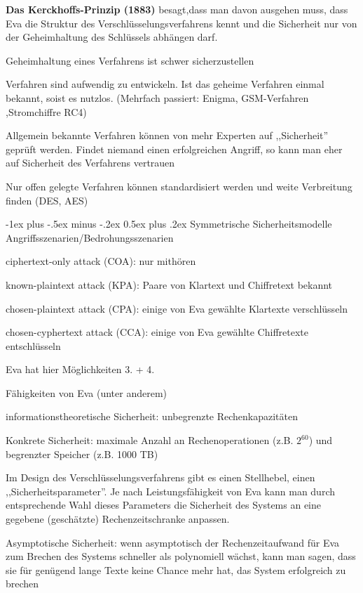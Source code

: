 \documentclass[a4paper]{article}
\makeatletter
\renewcommand{\note}[2]{\begin{noteBox} \textbf{#1} #2 \end{noteBox}}
\renewcommand{\section}{\@startsection{section}{1}{0mm}%
 {-1ex plus -.5ex minus -.2ex}%
 {0.5ex plus .2ex}%
 {\normalfont\large\bfseries}}
\makeatother
\begin{document}
\begin{multicols}{3}
    \note{Das Kerckhoffs-Prinzip (1883)}{
        besagt,dass man davon ausgehen muss, dass Eva die Struktur des Verschlüsselungsverfahrens kennt und die Sicherheit nur von der Geheimhaltung des Schlüssels abhängen darf.
        \begin{enumerate*}
            \item Geheimhaltung eines Verfahrens ist schwer sicherzustellen
            \item Verfahren sind aufwendig zu entwickeln. Ist das geheime Verfahren einmal bekannt, soist es nutzlos. (Mehrfach passiert: Enigma, GSM-Verfahren ,Stromchiffre RC4)
            \item Allgemein bekannte Verfahren können von mehr Experten auf ,,Sicherheit'' geprüft werden. Findet niemand einen erfolgreichen Angriff, so kann man eher auf Sicherheit des Verfahrens vertrauen
            \item Nur offen gelegte Verfahren können standardisiert werden und weite Verbreitung finden (DES, AES)
        \end{enumerate*}
    }

    \section{Symmetrische Sicherheitsmodelle}
    Angriffsszenarien/Bedrohungsszenarien
    \begin{enumerate*}
        \item ciphertext-only attack (COA): nur mithören
        \item known-plaintext attack (KPA): Paare von Klartext und Chiffretext bekannt
        \item chosen-plaintext attack (CPA): einige von Eva gewählte Klartexte verschlüsseln
        \item chosen-cyphertext attack (CCA): einige von Eva gewählte Chiffretexte entschlüsseln
        \item Eva hat hier Möglichkeiten 3. + 4.
    \end{enumerate*}

    Fähigkeiten von Eva (unter anderem)
    \begin{enumerate*}
        \item informationstheoretische Sicherheit: unbegrenzte Rechenkapazitäten
        \item Konkrete Sicherheit: maximale Anzahl an Rechenoperationen (z.B. $2^{60}$) und begrenzter Speicher (z.B. 1000 TB)
        \item Im Design des Verschlüsselungsverfahrens gibt es einen Stellhebel, einen ,,Sicherheitsparameter''. Je nach Leistungsfähigkeit von Eva kann man durch entsprechende Wahl dieses Parameters die Sicherheit des Systems an eine gegebene (geschätzte) Rechenzeitschranke anpassen.
        \item Asymptotische Sicherheit: wenn asymptotisch der Rechenzeitaufwand für Eva zum Brechen des Systems schneller als polynomiell wächst, kann man sagen, dass sie für genügend lange Texte keine Chance mehr hat, das System erfolgreich zu brechen
    \end{enumerate*}


\end{multicols}
\end{document}
